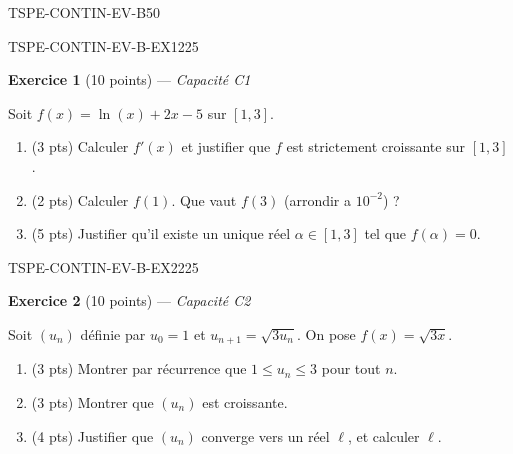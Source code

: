 

\begin{evaluation}{TSPE-CONTIN-EV-B}{50}


\begin{exercice}{TSPE-CONTIN-EV-B-EX1}{2}{25}

\textbf{Exercice 1} (10 points) — \textit{Capacité C1}

\medskip

Soit $f(x) = \ln(x) + 2x - 5$ sur $[1, 3]$.
\begin{enumerate}
  \item (3 pts) Calculer $f'(x)$ et justifier que $f$ est strictement croissante sur $[1,3]$.
  \item (2 pts) Calculer $f(1)$. Que vaut $f(3)$ (arrondir a $10^{-2}$) ?
  \item (5 pts) Justifier qu'il existe un unique réel $\alpha \in [1,3]$ tel que $f(\alpha) = 0$.
\end{enumerate}
\end{exercice}


\begin{exercice}{TSPE-CONTIN-EV-B-EX2}{2}{25}

\textbf{Exercice 2} (10 points) — \textit{Capacité C2}

\medskip

Soit $(u_n)$ définie par $u_0 = 1$ et $u_{n+1} = \sqrt{3u_n}$. On pose $f(x) = \sqrt{3x}$.
\begin{enumerate}
  \item (3 pts) Montrer par récurrence que $1 \leq u_n \leq 3$ pour tout $n$.
  \item (3 pts) Montrer que $(u_n)$ est croissante.
  \item (4 pts) Justifier que $(u_n)$ converge vers un réel $\ell$, et calculer $\ell$.
\end{enumerate}
\end{exercice}

\end{evaluation}

